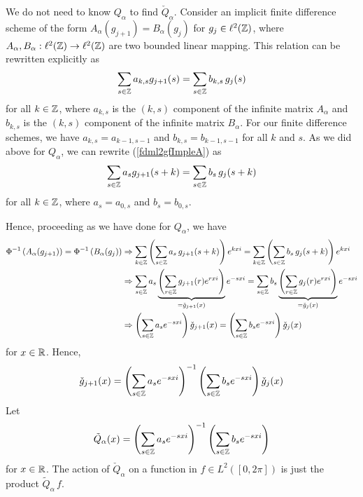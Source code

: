 We do not need to know $Q_\alpha$ to find $\check{Q}_\alpha$.
Consider an implicit finite difference scheme of the form
$\displaystyle A_\alpha(g_{j+1}) = B_\alpha(g_j)$ for $g_j \in \ell^2(\mathbb{Z})$,
where $A_\alpha , B_\alpha:\ell^2(\mathbb{Z}) \to \ell^2(\mathbb{Z})$ are two bounded
linear mapping.  This relation can be rewritten explicitly as
\begin{equation} \label{fdml2gfImpleA}
\sum_{s\in \mathbb{Z}} a_{k,s} g_{j+1}(s) = \sum_{s\in \mathbb{Z}} b_{k,s}\, g_j(s)
\end{equation}
for all $k \in \mathbb{Z}$, where $a_{k,s}$ is the $(k,s)$ component of the
infinite matrix $A_\alpha$ and $b_{k,s}$ is the $(k,s)$ component of the
infinite matrix $B_\alpha$.  For our finite difference schemes, we have
$a_{k,s} = a_{k-1,s-1}$ and $b_{k,s} = b_{k-1,s-1}$ for all $k$ and $s$.
As we did above for $Q_\alpha$, we can rewrite (\ref{fdml2gfImpleA}) as
\begin{equation} \label{fdml2gfImpl}
\sum_{s\in \mathbb{Z}} a_s g_{j+1}(s+k) = \sum_{s\in \mathbb{Z}} b_s\, g_j(s+k)
\end{equation}
for all $k\in \mathbb{Z}$, where $a_s = a_{0,s}$ and $b_s = b_{0,s}$.

Hence, proceeding as we have done for $Q_\alpha$, we have
\begin{align*}
\Phi^{-1}\left(A_\alpha(g_{j+1})\right) = \Phi^{-1}\left(B_\alpha(g_j)\right)
& \Rightarrow
\sum_{k\in \mathbb{Z}} \left(\sum_{s\in \mathbb{Z}} a_s\, g_{j+1}(s+k) \right) e^{kx i}
= \sum_{k\in \mathbb{Z}} \left(\sum_{s\in \mathbb{Z}} b_s\, g_j(s+k) \right) e^{kx i} \\
&\Rightarrow
\sum_{s\in \mathbb{Z}} a_s
\underbrace{\left( \sum_{r\in \mathbb{Z}}  g_{j+1}(r)
e^{rx i}\right)}_{=\check{g}_{j+1}(x)}  e^{-sx i}
= \sum_{s\in \mathbb{Z}} b_s
\underbrace{\left( \sum_{r\in \mathbb{Z}}  g_j(r)
e^{rx i}\right)}_{=\check{g}_j(x)}  e^{-sx i} \\
&\Rightarrow
\left( \sum_{s\in \mathbb{Z}} a_s e^{-sx i} \right) \check{g}_{j+1}(x)
= \left( \sum_{s\in \mathbb{Z}} b_s e^{-sx i} \right) \check{g}_j(x)
\end{align*}
for $x\in \mathbb{R}$.  Hence,
\[
\check{g}_{j+1}(x)
= \left( \sum_{s\in \mathbb{Z}} a_s e^{-sx i} \right)^{-1}
\left( \sum_{s\in \mathbb{Z}} b_s e^{-sx i} \right) \check{g}_j(x)
\]
Let
\[
\tilde{Q}_\alpha(x) = \left( \sum_{s\in \mathbb{Z}} a_s e^{-sx i} \right)^{-1}
\left( \sum_{s\in \mathbb{Z}} b_s e^{-sx i} \right)
\]
for $x \in \mathbb{R}$.  The action of $\check{Q}_\alpha$ on a function in
$f \in L^2([0,2\pi])$ is just the product $\tilde{Q}_\alpha\,f$.

